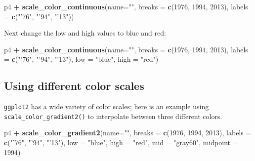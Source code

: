\documentclass[]{book}
\newenvironment{Shaded}{\begin{snugshade}}{\end{snugshade}}
\newcommand{\KeywordTok}[1]{\textcolor[rgb]{0.13,0.29,0.53}{\textbf{#1}}}
\newcommand{\DataTypeTok}[1]{\textcolor[rgb]{0.13,0.29,0.53}{#1}}
\newcommand{\DecValTok}[1]{\textcolor[rgb]{0.00,0.00,0.81}{#1}}
\newcommand{\StringTok}[1]{\textcolor[rgb]{0.31,0.60,0.02}{#1}}
\newcommand{\OperatorTok}[1]{\textcolor[rgb]{0.81,0.36,0.00}{\textbf{#1}}}
\newcommand{\NormalTok}[1]{#1}
\begin{document}
\begin{Shaded}
\begin{Highlighting}[]
\NormalTok{p4 }\OperatorTok{+}\StringTok{ }
\StringTok{  }\KeywordTok{scale_color_continuous}\NormalTok{(}\DataTypeTok{name=}\StringTok{""}\NormalTok{,}
                         \DataTypeTok{breaks =} \KeywordTok{c}\NormalTok{(}\DecValTok{1976}\NormalTok{, }\DecValTok{1994}\NormalTok{, }\DecValTok{2013}\NormalTok{),}
                         \DataTypeTok{labels =} \KeywordTok{c}\NormalTok{(}\StringTok{"'76"}\NormalTok{, }\StringTok{"'94"}\NormalTok{, }\StringTok{"'13"}\NormalTok{))}
\end{Highlighting}
\end{Shaded}

Next change the low and high values to blue and red:

\begin{Shaded}
\begin{Highlighting}[]
\NormalTok{p4 }\OperatorTok{+}
\StringTok{  }\KeywordTok{scale_color_continuous}\NormalTok{(}\DataTypeTok{name=}\StringTok{""}\NormalTok{,}
                         \DataTypeTok{breaks =} \KeywordTok{c}\NormalTok{(}\DecValTok{1976}\NormalTok{, }\DecValTok{1994}\NormalTok{, }\DecValTok{2013}\NormalTok{),}
                         \DataTypeTok{labels =} \KeywordTok{c}\NormalTok{(}\StringTok{"'76"}\NormalTok{, }\StringTok{"'94"}\NormalTok{, }\StringTok{"'13"}\NormalTok{),}
                         \DataTypeTok{low =} \StringTok{"blue"}\NormalTok{, }\DataTypeTok{high =} \StringTok{"red"}\NormalTok{)}
\end{Highlighting}
\end{Shaded}

\subsection{Using different color
scales}\label{using-different-color-scales}

\texttt{ggplot2} has a wide variety of color scales; here is an example
using \texttt{scale\_color\_gradient2()} to interpolate between three
different colors.

\begin{Shaded}
\begin{Highlighting}[]
\NormalTok{p4 }\OperatorTok{+}
\StringTok{  }\KeywordTok{scale_color_gradient2}\NormalTok{(}\DataTypeTok{name=}\StringTok{""}\NormalTok{,}
                        \DataTypeTok{breaks =} \KeywordTok{c}\NormalTok{(}\DecValTok{1976}\NormalTok{, }\DecValTok{1994}\NormalTok{, }\DecValTok{2013}\NormalTok{),}
                        \DataTypeTok{labels =} \KeywordTok{c}\NormalTok{(}\StringTok{"'76"}\NormalTok{, }\StringTok{"'94"}\NormalTok{, }\StringTok{"'13"}\NormalTok{),}
                        \DataTypeTok{low =} \StringTok{"blue"}\NormalTok{,}
                        \DataTypeTok{high =} \StringTok{"red"}\NormalTok{,}
                        \DataTypeTok{mid =} \StringTok{"gray60"}\NormalTok{,}
                        \DataTypeTok{midpoint =} \DecValTok{1994}\NormalTok{)}
\end{Highlighting}
\end{Shaded}
\end{document}
